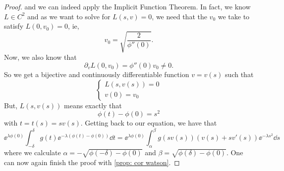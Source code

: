 \begin{proof}
	and we can indeed apply the Implicit Function Theorem. In fact, we know $L \in C^2$ and as we want to solve for $L(s,v) = 0$, we need that the $v_0$ we take to satisfy $L(0, v_0) = 0$, ie,
	\begin{equation}
		v_0 = \sqrt{\frac{2}{\phi''(0)}}.
	\end{equation}
	Now, we also know that
	\begin{equation}
		\partial_v L(0, v_0) = \phi''(0) v_0 \neq 0.
	\end{equation}
	So we get a bijective and continuously differentiable function $v = v(s)$ such that
	\begin{equation}
		\begin{cases}
			L(s, v(s)) = 0 \\
			v(0) = v_0
		\end{cases}
	\end{equation}
	But, $L(s, v(s))$ means exactly that
	\begin{equation}
		\phi(t) - \phi(0) = s^2
	\end{equation}
	with $t = t(s) = sv(s)$. Getting back to our equation, we have that
	\begin{equation}
		\ee^{\lambda \phi(0)} \int_{-\delta}^{\delta} g(t) \ee^{-\lambda (\phi(t)-\phi(0))} \dd t = \ee^{\lambda \phi(0)} \int_{\alpha}^{\beta} g(sv(s)) (v(s) + sv'(s)) \ee^{-\lambda s^2} \dd s
	\end{equation}
	where we calculate $\alpha = - \sqrt{\phi(-\delta) - \phi(0)}$ and $\beta = \sqrt{\phi(\delta) - \phi(0)}$. One can now again finish the proof with \autoref{prop: cor watson}.
\end{proof}

